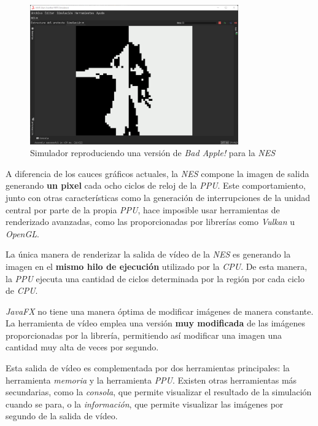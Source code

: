 \begin{figure}[h]
    \centering
    \includegraphics[width=0.8\textwidth]{images/nes/nes-video}
    \caption{Simulador reproduciendo una versión de \textit{Bad Apple!} para la \textit{NES}}
    \label{fig:nes-video}
\end{figure}

A diferencia de los cauces gráficos actuales, la \textit{NES}
compone la imagen de salida generando \textbf{un pixel} cada
ocho ciclos de reloj de la \textit{PPU}.
Este comportamiento, junto con otras características como
la generación de interrupciones de la unidad central
por parte de la propia \textit{PPU}, hace imposible usar
herramientas de renderizado avanzadas, como las proporcionadas
por librerías como \textit{Vulkan} u \textit{OpenGL}.

La única manera de renderizar la salida de vídeo de la \textit{NES}
es generando la imagen en el \textbf{mismo hilo de ejecución}
utilizado por la \textit{CPU}.
De esta manera, la \textit{PPU} ejecuta una cantidad de ciclos
determinada por la región por cada ciclo de \textit{CPU}.

\textit{JavaFX} no tiene una manera óptima de modificar
imágenes de manera constante.
La herramienta de vídeo emplea una versión \textbf{muy modificada}
de las imágenes proporcionadas por la librería,
permitiendo así modificar una imagen una cantidad muy alta
de veces por segundo.

Esta salida de vídeo es complementada por dos herramientas principales:
la herramienta \textit{memoria} y la herramienta \textit{PPU}.
Existen otras herramientas más secundarias, como la \textit{consola}, que permite
visualizar el resultado de la simulación cuando se para, o
la \textit{información}, que permite visualizar las imágenes por segundo
de la salida de vídeo.

